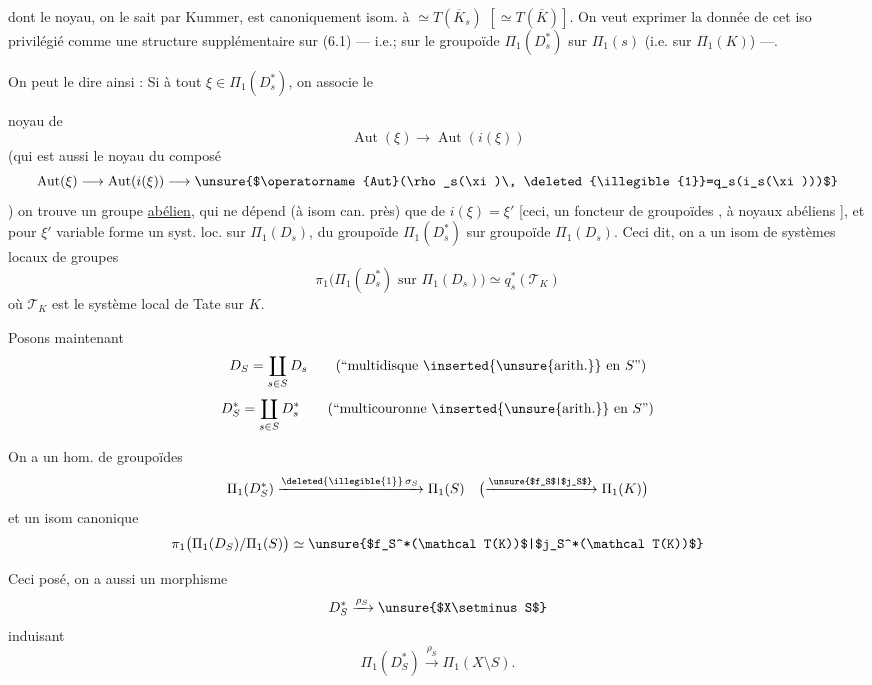 dont le noyau, on le sait par Kummer, est canoniquement isom. à
$\simeq T(\overline K_s)$ $[\simeq T(\overline K)]$.
On veut exprimer la donnée de cet iso privilégié comme une structure
supplémentaire sur (6.1) --- 
i.e.; sur le groupoïde $\Pi_1(D_s^*)$ sur $\Pi_1(s)$
(i.e. sur $\Pi_1(K)$) ---.

On peut le dire ainsi :  Si à tout
\deleted{\unsure{$\xi$}} $\xi\in\Pi_1(D_s^*)$, on associe le



noyau de
\[
\operatorname{Aut}(\xi)\longrightarrow\operatorname{Aut}(i(\xi))
\]
(qui est aussi le noyau du composé
\[
\operatorname{Aut}(\xi)\longrightarrow\operatorname{Aut}(i(\xi))
\longrightarrow
\text{\unsure{$\operatorname{Aut}(\rho_s(\xi)\,
\deleted{\illegible{1}}=q_s(i_s(\xi)))$}}
\]
)
on trouve un groupe \uline{abélien}, qui ne dépend (à isom can. près)
que  de $i(\xi)=\xi'$
[ceci, 
 un foncteur
 de groupoïdes ,
à noyaux abéliens ],
et pour $\xi'$ variable forme un syst. loc. sur $\Pi_1(D_s)$,
du groupoïde $\Pi_1(D_s^*)$ sur  groupoïde
$\Pi_1(D_s)$. Ceci dit, on a un isom de systèmes locaux de groupes
\[
\pi_1\bigl(\Pi_1(D_s^*)\text{ sur }\Pi_1(D_s)\bigr)
\simeq q_s^*(\mathcal T_K)
\]
où $\mathcal T_K$ est le système local de Tate sur $K$.



Posons maintenant
\[
D_S=\coprod_{s\in S}D_s
\qquad\text{(``multidisque \inserted{\unsure{arith.}} en $S$'')}
\]
\[
D_S^*=\coprod_{s\in S}D_s^*
\qquad\text{(``multicouronne \inserted{\unsure{arith.}} en $S$'')}
\]

On a un hom. de groupoïdes
\[
\Pi_1(D_S^*)
\xrightarrow{\text{\deleted{\illegible{1}}}\,\sigma_S}
\Pi_1(S)
\quad\bigl(\xrightarrow{\text{\unsure{$f_S$|$j_S$}}}\Pi_1(K)\bigr)
\]
et un isom canonique
\[
\pi_1\bigl(\Pi_1(D_S)/\Pi_1(S)\bigr)
\simeq
\text{\unsure{$f_S^*(\mathcal T(K))$|$j_S^*(\mathcal T(K))$}}
\]

Ceci posé, on a aussi un morphisme
\[
D_S^*\xrightarrow{\rho_S}\text{\unsure{$X\setminus S$}}
\]
induisant
\[
\Pi_1(D_S^*)\xrightarrow{\rho_S}\Pi_1(X\setminus S).
\]

